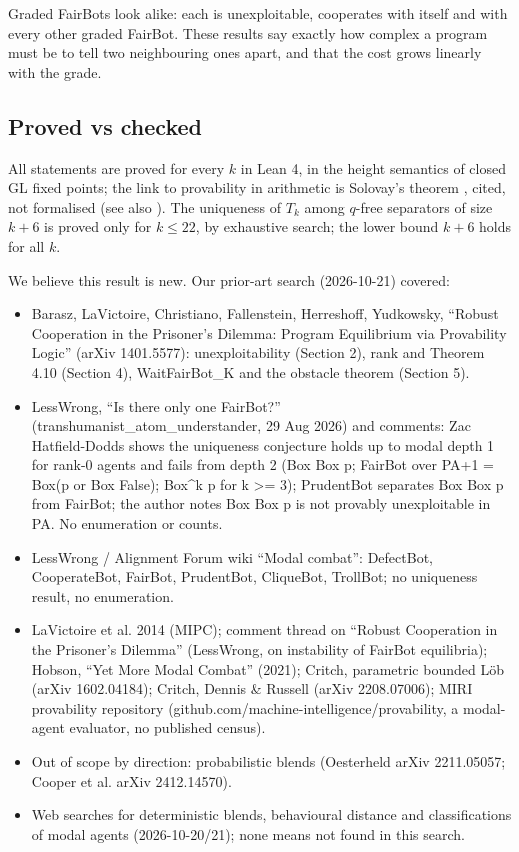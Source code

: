 \documentclass{article}
\begin{document}
Graded FairBots look alike: each is unexploitable, cooperates with itself and with every other
graded FairBot. These results say exactly how complex a program must be to tell two neighbouring
ones apart, and that the cost grows linearly with the grade.

\subsection*{Proved vs checked}

All statements are proved for every $k$ in Lean 4, in the height semantics of closed GL fixed
points; the link to provability in arithmetic is Solovay's theorem \cite{solovay1976provability},
cited, not formalised (see also \cite{boolos1993logic}). The uniqueness of $T_k$ among $q$-free
separators of size $k+6$ is proved only for $k \le 22$, by exhaustive search; the lower bound
$k+6$ holds for all $k$.

We believe this result is new. Our prior-art search (2026-10-21) covered:

\begin{itemize}
\item Barasz, LaVictoire, Christiano, Fallenstein, Herreshoff, Yudkowsky, ``Robust Cooperation in the Prisoner's Dilemma: Program Equilibrium via Provability Logic'' (arXiv 1401.5577): unexploitability (Section 2), rank and Theorem 4.10 (Section 4), WaitFairBot\_K and the obstacle theorem (Section 5).
\item LessWrong, ``Is there only one FairBot?'' (transhumanist\_atom\_understander, 29 Aug 2026) and comments: Zac Hatfield-Dodds shows the uniqueness conjecture holds up to modal depth 1 for rank-0 agents and fails from depth 2 (Box Box p; FairBot over PA+1 = Box(p or Box False); Box\textasciicircum{}k p for k \textgreater{}= 3); PrudentBot separates Box Box p from FairBot; the author notes Box Box p is not provably unexploitable in PA. No enumeration or counts.
\item LessWrong / Alignment Forum wiki ``Modal combat'': DefectBot, CooperateBot, FairBot, PrudentBot, CliqueBot, TrollBot; no uniqueness result, no enumeration.
\item LaVictoire et al. 2014 (MIPC); comment thread on ``Robust Cooperation in the Prisoner's Dilemma'' (LessWrong, on instability of FairBot equilibria); Hobson, ``Yet More Modal Combat'' (2021); Critch, parametric bounded Löb (arXiv 1602.04184); Critch, Dennis \& Russell (arXiv 2208.07006); MIRI provability repository (github.com/machine-intelligence/provability, a modal-agent evaluator, no published census).
\item Out of scope by direction: probabilistic blends (Oesterheld arXiv 2211.05057; Cooper et al. arXiv 2412.14570).
\item Web searches for deterministic blends, behavioural distance and classifications of modal agents (2026-10-20/21); none means not found in this search.
\end{itemize}
\end{document}
